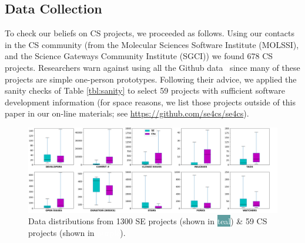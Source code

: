 \documentclass[sigconf]{acmart}
\begin{document}

 

 
 
\subsection{Data Collection}\label{tion:data}


To check our beliefs on CS projects, we proceeded as follows. 
Using our contacts in the CS community
(from the Molecular Sciences Software Institute (MOLSSI), and the Science Gateways Community Institute (SGCI)) we found
678 CS  projects.
Researchers
warn against using all the Github data~\cite{bird09promise,agrawal2018we, eirini15promise, munaiah17curating} since
many of these projects are simple one-person prototypes.
Following  their advice, we applied the sanity checks of Table \ref{tbl:sanity}
to select 59  projects with sufficient software development information
(for space reasons, we list those projects outside of this paper in our on-line materials; see \url{https://github.com/se4cs/se4cs}).
 
\begin{figure}[!t]
\vspace{5pt}
\centering \includegraphics[width=.975\linewidth]{img/Figure_1.png}
\caption{Data distributions from 1300 SE projects (shown in \colorbox{cadetblue}{ \textcolor{white}{teal}}) \& 59 CS projects (shown in \colorbox{amethyst}{ \textcolor{white}{purple}}).}\label{fig:comparison}
\end{figure}    
\end{document}
